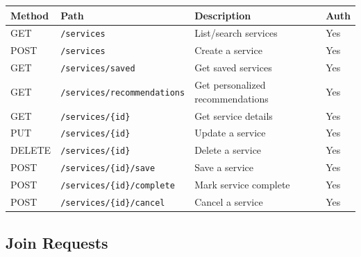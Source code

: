 \documentclass[10pt,a4paper]{report}
\begin{document}
\begin{longtable}{|l|p{4.5cm}|p{5cm}|l|}
    \hline
    \textbf{Method} & \textbf{Path}                          & \textbf{Description}                & \textbf{Auth} \\
    \hline
    \endhead
    GET             & \texttt{/services}                     & List/search services                & Yes           \\
    \hline
    POST            & \texttt{/services}                     & Create a service                    & Yes           \\
    \hline
    GET             & \texttt{/services/saved}               & Get saved services                  & Yes           \\
    \hline
    GET             & \texttt{/services/recommendations}     & Get personalized recommendations    & Yes           \\
    \hline
    GET             & \texttt{/services/\{id\}}              & Get service details                 & Yes           \\
    \hline
    PUT             & \texttt{/services/\{id\}}              & Update a service                    & Yes           \\
    \hline
    DELETE          & \texttt{/services/\{id\}}              & Delete a service                    & Yes           \\
    \hline
    POST            & \texttt{/services/\{id\}/save}         & Save a service                      & Yes           \\
    \hline
    POST            & \texttt{/services/\{id\}/complete}     & Mark service complete               & Yes           \\
    \hline
    POST            & \texttt{/services/\{id\}/cancel}       & Cancel a service                    & Yes           \\
    \hline
\end{longtable}

\subsection{Join Requests}
\end{document}
